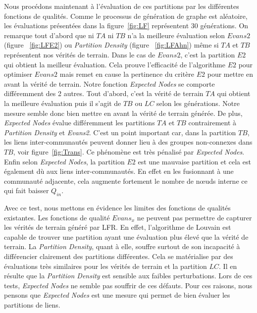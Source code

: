Nous procédons maintenant à l'évaluation de ces partitions par les différentes fonctions de qualités.
Comme le processus de génération de graphe est aléatoire, les évaluations présentées dans la figure~\ref{fig:LF} représentent $30$ générations.
On remarque tout d'abord que ni $TA$ ni $TB$ n'a la meilleure évaluation selon $Evans2$ (figure ~\ref{fig:LFE2}) ou \emph{Partition Density} (figure ~\ref{fig:LFAhn}) même si $TA$ et $TB$ représentent nos vérités de terrain.
Dans le cas de $Evans2$, c'est la partition $E2$ qui obtient la meilleur évaluation.
Cela prouve l'efficacité de l'algorithme $E2$ pour optimiser $Evans2$ mais remet en cause la pertinence du critère $E2$ pour mettre en avant la vérité de terrain.
Notre fonction \emph{Expected Nodes} se comporte différemment des 2 autres.
Tout d'abord, c'est la vérité de terrain $TA$ qui obtient la meilleure évaluation puis il s'agit de $TB$ ou $LC$ selon les générations.
Notre mesure semble donc bien mettre en avant la vérité de terrain générée.
De plus, \emph{Expected Nodes} évalue différemment les partitions $TA$ et $TB$ contrairement à \emph{Partition Density} et \emph{Evans2}.
C'est un point important car, dans la partition $TB$, les liens inter-communautés peuvent donner lieu à des groupes non-connexes dans $TB$, voir figure~\ref{fig:Trans}.
Ce phénomène est très pénalisé par \emph{Expected Nodes}.
Enfin selon \emph{Expected Nodes}, la partition $E2$ est une mauvaise partition et cela est également dù aux liens inter-communautés.
En effet en les fusionnant à une communauté adjacente, cela augmente fortement le nombre de n\oe uds interne ce qui fait baisser $Q_{in}$.

Avec ce test, nous mettons en évidence les limites des fonctions de qualités existantes.
Les fonctions de qualité $Evans_x$ ne peuvent pas permettre de capturer les vérités de terrain généré par LFR.
En effet, l'algorithme de Louvain est capable de trouver une partition ayant une évaluation plus élevé que la vérité de terrain.
La \emph{Partition Density}, quant à elle, souffre surtout de son incapacité à différencier clairement des partitions différentes.
Cela se matérialise par des évaluations très similaires pour les vérités de terrain et la partition $LC$.
Il en résulte que la \emph{Partition Density} est sensible aux faibles perturbations.
Lors de ces tests, \emph{Expected Nodes} ne semble pas souffrir de ces défauts.
Pour ces raisons, nous pensons que \emph{Expected Nodes} est une mesure qui permet de bien évaluer les partitions de liens.


